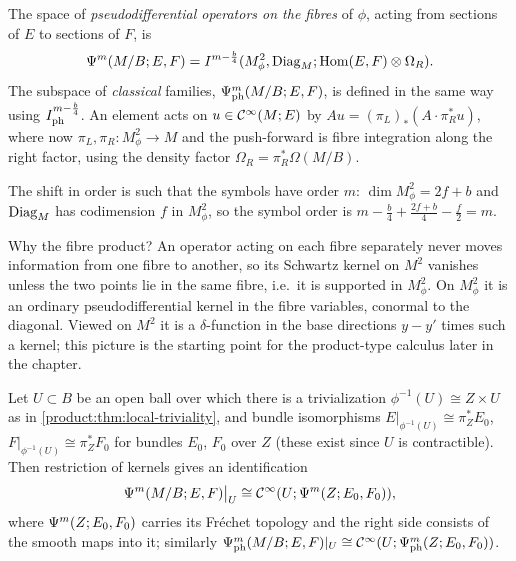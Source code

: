 \begin{definition}\label{product:def:fibre-psido}
The space of \emph{pseudodifferential operators on the fibres} of $\phi$, acting
from sections of $E$ to sections of $F$, is
\begin{equation*}
\Psi^{m}(M/B;E,F)=I^{m-\frac b4}(M^2_\phi,\operatorname{Diag}_M;\operatorname{Hom}(E,F)\otimes\Omega_R).
\end{equation*}
The subspace of \emph{classical} families, $\Psi^{m}_{\mathrm{ph}}(M/B;E,F)$, is
defined in the same way using $I^{m-\frac b4}_{\mathrm{ph}}$. An element acts on
$u\in\mathcal{C}^\infty(M;E)$ by $Au=(\pi_L)_*(A\cdot\pi_R^*u)$, where now
$\pi_L,\pi_R:M^2_\phi\longrightarrow M$ and the push-forward is fibre integration
along the right factor, using the density factor $\Omega_R=\pi_R^*\Omega(M/B)$.
\end{definition}

The shift in order is such that the symbols have order $m$: $\dim M^2_\phi=2f+b$
and $\operatorname{Diag}_M$ has codimension $f$ in $M^2_\phi$, so the symbol order is
$m-\frac b4+\frac{2f+b}4-\frac f2=m$.

\begin{discussion}
  Why the fibre product? An operator acting on each fibre separately never moves
  information from one fibre to another, so its Schwartz kernel on $M^2$ vanishes
  unless the two points lie in the same fibre, i.e.\ it is supported in
  $M^2_\phi$. On $M^2_\phi$ it is an ordinary pseudodifferential kernel in the
  fibre variables, conormal to the diagonal. Viewed on $M^2$ it is a
  $\delta$-function in the base directions $y-y'$ times such a kernel; this
  picture is the starting point for the product-type calculus later in the
  chapter.
\end{discussion}

\begin{lemma}\label{product:lem:local-families}
Let $U\subset B$ be an open ball over which there is a trivialization
$\phi^{-1}(U)\cong Z\times U$ as in \cref{product:thm:local-triviality}, and
bundle isomorphisms $E|_{\phi^{-1}(U)}\cong\pi_Z^*E_0$,
$F|_{\phi^{-1}(U)}\cong\pi_Z^*F_0$ for bundles $E_0$, $F_0$ over $Z$ (these exist
since $U$ is contractible). Then restriction of kernels gives an identification
\begin{equation*}
\Psi^{m}(M/B;E,F)\big|_U\cong\mathcal{C}^\infty(U;\Psi^{m}(Z;E_0,F_0)),
\end{equation*}
where $\Psi^{m}(Z;E_0,F_0)$ carries its Fréchet topology and the right side
consists of the smooth maps into it; similarly
$\Psi^{m}_{\mathrm{ph}}(M/B;E,F)|_U\cong\mathcal{C}^\infty(U;\Psi^{m}_{\mathrm{ph}}(Z;E_0,F_0))$.
\end{lemma}

